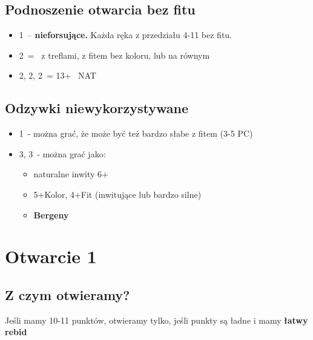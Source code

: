 \documentclass[12pt, a4paper]{article}
\begin{document}
\subsection*{Podnoszenie otwarcia bez fitu}
\begin{itemize}
    \item 1\nt\ -- \textbf{nieforsujące.} Każda ręka z przedziału 4-11 bez fitu.
    \item 2\clubs\ = \gf\ z treflami, z fitem bez koloru, lub na równym
    \item 2\diams, 2\hearts, 2\spades\ = 13+ \gf\ NAT
\end{itemize}

\subsection*{Odzywki niewykorzystywane}
\begin{itemize}
    \item 1\nt\ - można grać, że może być też bardzo słabe z fitem (3-5 PC)
    \item 3\clubs, 3\diams\ - można grać jako:
    \begin{itemize}
        \item naturalne inwity 6+
        \item 5+Kolor, 4+Fit (inwitujące lub bardzo silne)
        \item \textbf{Bergeny}
    \end{itemize}
\end{itemize}



\pagebreak
\section{Otwarcie 1\diams}
\subsection*{Z czym otwieramy?}
\begin{formal}
    Jeśli mamy 10-11 punktów, otwieramy tylko, jeśli punkty są ładne i mamy \textbf{łatwy rebid}
\end{formal}
\end{document}
